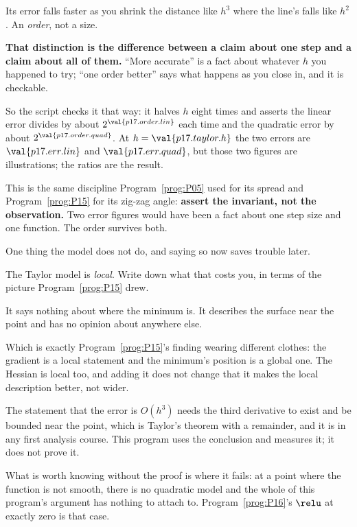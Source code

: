 \begin{fr}
\begin{ansblock}
Its error falls faster as you shrink the distance \dash{} like $h^{3}$ where
the line's falls like $h^{2}$. An \emph{order}, not a size.
\end{ansblock}

\textbf{That distinction is the difference between a claim about one step and a
claim about all of them.} \enquote{More accurate} is a fact about whatever $h$
you happened to try; \enquote{one order better} says what happens as you close
in, and it is checkable.

So the script checks it that way: it halves $h$ eight times and asserts the
linear error divides by about $2^{\val{p17.order.lin}}$ each time and the
quadratic error by about $2^{\val{p17.order.quad}}$. At
$h = \val{p17.taylor.h}$ the two errors are $\val{p17.err.lin}$ and
$\val{p17.err.quad}$, but those two figures are illustrations; the ratios are
the result.

\begin{note}
This is the same discipline Program~\ref{prog:P05} used for its spread and
Program~\ref{prog:P15} for its zig-zag angle: \textbf{assert the invariant, not
the observation.} Two error figures would have been a fact about one step size
and one function. The order survives both.
\end{note}
\end{fr}

\begin{fr}
One thing the model does not do, and saying so now saves trouble later.

The Taylor model is \emph{local}. Write down what that costs you, in terms of
the picture Program~\ref{prog:P15} drew.
\dotline
\nextframe
\end{fr}

\begin{fr}
\begin{ansblock}
It says nothing about where the minimum is. It describes the surface near the
point and has no opinion about anywhere else.
\end{ansblock}

Which is exactly Program~\ref{prog:P15}'s finding wearing different clothes:
the gradient is a local statement and the minimum's position is a global one.
The Hessian is local too, and adding it does not change that \dash{} it makes
the local description better, not wider.

\begin{rigourbox}
The statement that the error is $O(h^{3})$ needs the third derivative to exist
and be bounded near the point, which is Taylor's theorem with a remainder, and
it is in any first analysis course. This program uses the conclusion and
measures it; it does not prove it.

What is worth knowing without the proof is where it fails: at a point where
the function is not smooth, there is no quadratic model and the whole of this
program's argument has nothing to attach to. Program~\ref{prog:P16}'s $\relu$
at exactly zero is that case.
\end{rigourbox}
\end{fr}

